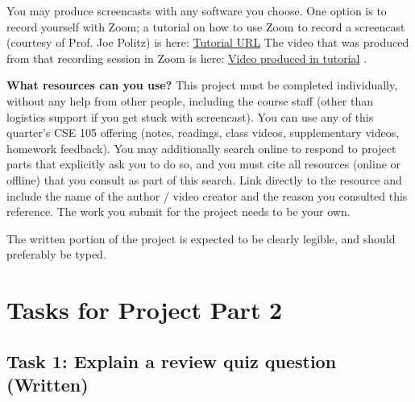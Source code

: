\documentclass[12pt, oneside]{article}
\begin{document}
 You may produce screencasts with any software you choose. One option is to record yourself 
 with Zoom; a tutorial on how to use Zoom to record a screencast (courtesy of Prof. Joe Politz) is 
 here: \href{https://drive.google.com/open?id=1KROMAQuTCk40zwrEFotlYSJJQdcG_GUU}{Tutorial URL}
 The video that was produced from that recording session in Zoom is here:
 \href{{https://drive.google.com/open?id=1MxJN6CQcXqIbOekDYMxjh7mTt1TyRVMl}}{Video produced in tutorial} .
 
 {\bf What resources can you use? }
 This project must be completed individually, without any help from other people, 
 including the course staff (other than logistics support if you get stuck with screencast). 
 You can use any of this quarter’s CSE 105 offering (notes, readings, class videos, 
 supplementary videos, homework feedback). You may additionally search online to respond to 
 project parts that explicitly ask you to do so, and you must  cite all resources (online or offline) 
 that you consult as part of this search. Link directly to the resource and include the name of the 
 author / video creator and the reason you consulted this reference. The work you submit for the 
 project needs to be your own. 
 
The written portion of the project is expected to be clearly legible, and should preferably be typed.

 \newpage
 \section{Tasks for Project Part 2}


 \subsection{Task 1: Explain a review quiz question (Written)}
	
\end{document}
